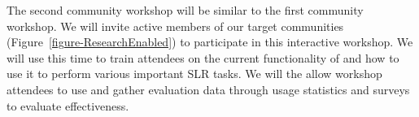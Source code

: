 The second community workshop will be similar to the first community workshop.
We will invite active members of our target communities (Figure~\ref{figure-ResearchEnabled}) to participate in this interactive workshop.
We will use this time to train attendees on the current functionality of {\IT} and how to use it to perform various important SLR tasks.
We will the allow workshop attendees to use {\IT} and gather evaluation data through usage statistics and surveys to evaluate effectiveness.
